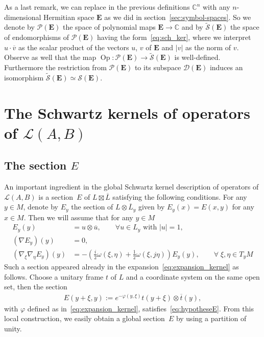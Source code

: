 \documentclass[10pt,a4paper]{article}
\theoremstyle{definition}
\numberwithin{equation}{section}
\newcommand{\C}{{\mathbb{C}}}
\newcommand{\om}{{\omega}}
\newcommand{\con}{\overline}
\newcommand{\op}{\operatorname}
\newcommand{\D}{\mathcal{D}}
\newcommand{\symb}{\mathcal{S}}
\newcommand{\lag}{\mathcal{L}}
\newcommand{\pol}{\mathcal{P}}
\newcommand{\EE}{\mathbf{E}}
\let\oldforall\forall
\renewcommand*{\forall}{\mathrel{\oldforall}}
\begin{document}
As a last remark, we can replace in the previous definitions $\C^n$ with any $n$-dimensional Hermitian space $\EE$ as we did in section~\ref{sec:symbol-spaces}. So we denote by $\pol (\EE)$ the space of polynomial maps $\EE \rightarrow \C$ and by $\widetilde{\symb} (\EE)$ the space of endomorphisms of $\pol (\EE)$ having the form~\eqref{eq:sch_ker}, where we interpret $u \cdot \con{v}$ as the scalar product of the vectors $u$, $v$ of $\EE$ and $|v|$ as the norm of $v$. Observe as well that the map $\op{Op} : \pol (\EE) \rightarrow
\widetilde{\symb} (\EE)$ is well-defined. Furthermore the restriction from $\pol (\EE)$ to its subspace $\D (\EE)$ induces an isomorphism $\widetilde{\symb} (\EE) \simeq \symb (\EE)$.


\section{The Schwartz kernels of operators of \texorpdfstring{$\lag (A, B)$}{L(A,B)} } \label{sec:schw-kern-oper}



\subsection{The section \texorpdfstring{$E$}{E}} \label{sec:section-ee}

An important ingredient in the global Schwartz kernel description of operators of $\lag (A,B)$ is a section~$E$ of $L \boxtimes \con{L}$ satisfying the following conditions. For any $y\in M$, denote by $E_y $ the section of $L \otimes \con{L}_y$ given by $E_y(x) = E(x,y)$ for any $x \in M$. Then we will assume that for any $y\in M$
\begin{equation}\label{eq:hypotheseE}
\begin{split}
 E_y(y) &= u \otimes \con{u},   \qquad\forall u \in L_y \text{ with } |u| =1, \\
 (\nabla E_y)(y) &=0,  \\
 (\nabla_{\xi} \nabla_{\eta} E_y)(y) &= - \left(\tfrac{i}{2} \om (\xi, \eta) + \tfrac{1}{2}
\om (\xi, j \eta) \right) E_y (y),  \qquad\forall \; \xi, \eta \in T_yM
\end{split}
\end{equation}
Such a section appeared already in the expansion~\eqref{eq:expansion_kernel} as follows. Choose a unitary frame $t$ of $L$ and a coordinate system on the same open set, then the section
\begin{gather}\label{eq:exempleE}
E (y+ \xi, y) := e^{-\varphi (y, \xi)} t(y+ \xi) \otimes \con{t}(y),
\end{gather}
with $\varphi$ defined as in~\eqref{eq:expansion_kernel}, satisfies~\eqref{eq:hypotheseE}. From this local construction, we easily obtain a global section~$E$ by using a partition of unity.
\end{document}
